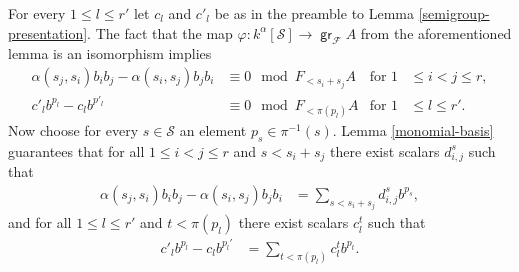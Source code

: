 \documentclass[11pt,fleqn]{article}
\theoremstyle{plain}
\theoremstyle{remark}
\theoremstyle{definition}
\renewcommand\to{\longrightarrow}
\renewcommand\phi{\varphi}
\renewcommand\S{\mathcal S}
\newcommand\F{\mathcal F}
\DeclareMathOperator\gr{\mathsf{gr}}
\begin{document}
For every $1 \leq l \leq r'$ let $c_l$ and $c'_l$ be as in the preamble to Lemma
\ref{semigroup-presentation}. The fact that the map $\phi: k^\alpha[\S] \to \gr_\F A$ from
the aforementioned lemma is an isomorphism implies 
\begin{align*}
\alpha(s_j,s_i) b_i b_j - \alpha(s_i,s_j) b_j b_i &\equiv 0 \mod F_{<s_i + s_j}A &
\mbox{for } 1 &\leq i < j \leq r,\\
c'_l b^{p_l} - c_l b^{p'_l} &\equiv 0 \mod F_{<\pi(p_l)}A &\mbox{for } 1 &\leq l \leq r'.
\end{align*}
Now choose for every $s \in \S$ an element $p_s \in \pi^{-1}(s)$. Lemma
\ref{monomial-basis} guarantees that for all $1 \leq i < j \leq r$ and $s < s_i + s_j$
there exist scalars $d^s_{i,j}$ such that 
\begin{align*}
\alpha(s_j, s_i)b_i b_j - \alpha(s_i,s_j)b_j b_i &= \sum_{s < s_i + s_j} d_{i,j}^{s}
b^{p_s},
\end{align*}
and for all $1 \leq l \leq r'$ and $t < \pi(p_l)$ there exist scalars $c^t_l$ such that
\begin{align*}
c'_l b^{p_l} - c_l b^{p_l'} &= \sum_{t < \pi(p_l)} c_l^{t} b^{p_t}.
\end{align*}
\end{document}
